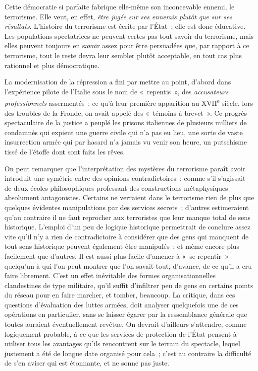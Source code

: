 \documentclass[french,twoside]{book} %
\def\bignobreak{\ifdim\lastskip<\bigskipamount
  \removelastskip\nopagebreak\bigskip\fi}
\newcommand{\labelblock}[1]{\bigbreak{\color{rubric}\noindent\textbf{#1}\par}\bignobreak}
\begin{document}
\labelblock{IX}

\noindent Cette démocratie si parfaite fabrique elle-même son inconcevable ennemi, le terrorisme. Elle veut, en effet, \emph{être jugée sur ses ennemis plutôt que sur ses résultats}. L’histoire du terrorisme est écrite par l’État ; elle est donc éducative. Les populations spectatrices ne peuvent certes pas tout savoir du terrorisme, mais elles peuvent toujours en savoir assez pour être persuadées que, par rapport à ce terrorisme, tout le reste devra leur sembler plutôt acceptable, en tout cas plus rationnel et plus démocratique.\par
La modernisation de la répression a fini par mettre au point, d’abord dans l’expérience pilote de l’Italie sous le nom de « repentis », des \emph{accusateurs professionnels} assermentés ; ce qu’à leur première apparition au XVII\textsuperscript{e} siècle, lors des troubles de la Fronde, on avait appelé des « témoins à brevet ». Ce progrès spectaculaire de la justice a peuplé les prisons italiennes de plusieurs milliers de condamnés qui expient une guerre civile qui n’a pas eu lieu, une sorte de vaste insurrection armée qui par hasard n’a jamais vu venir son heure, un putschisme tissé de l’étoffe dont sont faits les rêves.\par
On peut remarquer que l’interprétation des mystères du terrorisme paraît avoir introduit une symétrie entre des opinions contradictoires ; comme s’il s’agissait de deux écoles philosophiques professant des constructions métaphysiques absolument antagonistes. Certains ne verraient dans le terrorisme rien de plus que quelques évidentes manipulations par des services secrets ; d’autres estimeraient qu’au contraire il ne faut reprocher aux terroristes que leur manque total de sens historique. L’emploi d’un peu de logique historique permettrait de conclure assez vite qu’il n’y a rien de contradictoire à considérer que des gens qui manquent de tout sens historique peuvent également être manipulés ; et même encore plus facilement que d’autres. Il est aussi plus facile d’amener à « se repentir » quelqu’un à qui l’on peut montrer que l’on savait tout, d’avance, de ce qu’il a cru faire librement. C’est un effet inévitable des formes organisationnelles clandestines de type militaire, qu’il suffit d’infiltrer peu de gens en certains points du réseau pour en faire marcher, et tomber, beaucoup. La critique, dans ces questions d’évaluation des luttes armées, doit analyser quelquefois une de ces opérations en particulier, sans se laisser égarer par la ressemblance générale que toutes auraient éventuellement revêtue. On devrait d’ailleurs s’attendre, comme logiquement probable, à ce que les services de protection de l’État pensent à utiliser tous les avantages qu’ils rencontrent sur le terrain du spectacle, lequel justement a été de longue date organisé pour cela ; c’est au contraire la difficulté de s’en aviser qui est étonnante, et ne sonne pas juste.\par
\end{document}
